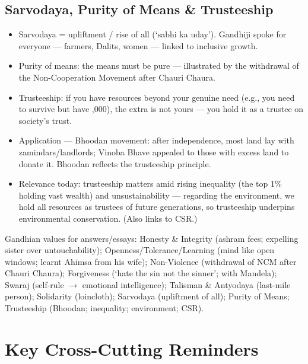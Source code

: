 \subsection{Sarvodaya, Purity of Means \& Trusteeship}

\begin{itemize}
\item Sarvodaya = upliftment / rise of all (`sabhi ka uday'). Gandhiji spoke for everyone --- farmers, Dalits, women --- linked to inclusive growth.
\item Purity of means: the means must be pure --- illustrated by the withdrawal of the Non-Cooperation Movement after Chauri Chaura.
\end{itemize}

\begin{KeyConcept}
\begin{itemize}
\item Trusteeship: if you have resources beyond your genuine need (e.g., you need  to survive but have ,000), the extra is not yours --- you hold it as a trustee on society's trust.
\item Application --- Bhoodan movement: after independence, most land lay with zamindars/landlords; Vinoba Bhave appealed to those with excess land to donate it. Bhoodan reflects the trusteeship principle.
\item Relevance today: trusteeship matters amid rising inequality (the top 1\% holding vast wealth) and unsustainability --- regarding the environment, we hold all resources as trustees of future generations, so trusteeship underpins environmental conservation. (Also links to CSR.)
\end{itemize}
\end{KeyConcept}

\begin{QuickRevision}
Gandhian values for answers/essays: Honesty \& Integrity (ashram fees; expelling sister over untouchability); Openness/Tolerance/Learning (mind like open windows; learnt Ahimsa from his wife); Non-Violence (withdrawal of NCM after Chauri Chaura); Forgiveness (`hate the sin not the sinner'; with Mandela); Swaraj (self-rule $\rightarrow$ emotional intelligence); Talisman \& Antyodaya (last-mile person); Solidarity (loincloth); Sarvodaya (upliftment of all); Purity of Means; Trusteeship (Bhoodan; inequality; environment; CSR).
\end{QuickRevision}

\section{Key Cross-Cutting Reminders}

